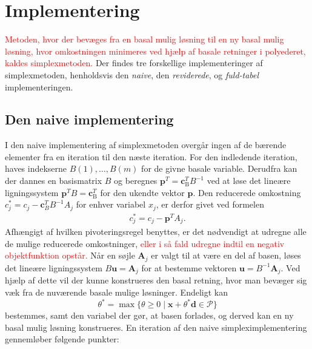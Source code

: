 %
\section{Implementering}
\label{julieergudesmuk}
\textcolor{red}{Metoden, hvor der bevæges fra en basal mulig løsning til en ny basal mulig løsning, hvor omkostningen minimeres ved hjælp af basale retninger i polyederet, kaldes simplexmetoden.}
Der findes tre forskellige implementeringer af simplexmetoden, henholdsvis den \textit{naive}, den \textit{reviderede}, og \textit{fuld-tabel} implementeringen.
%
\subsection{Den naive implementering}
I den naive implementering af simplexmetoden overgår ingen af de bærende elementer fra en iteration til den næste iteration. 
For den indledende iteration, haves indekserne
$B(1),\ldots,B(m)$ for de givne basale variable. 
Derudfra kan der dannes en basismatrix $B$ og beregnes $\mathbf{p}^T=\mathbf{c}_{\text{B}}^T B^{-1}$ ved at løse det lineære ligningssystem $\mathbf{p}^T B=\mathbf{c}_{\text{B}}^T$ for den ukendte vektor $\mathbf{p}$.
Den reducerede omkostning $c_j^* = c_j - \mathbf{c}_B^T B^{-1}A_j$ for enhver variabel $x_j$, er derfor givet ved formelen
%
\begin{align*}
c_j^* = c_j - \mathbf{p}^T A_j.
\end{align*}
%
Afhængigt af hvilken pivoteringsregel benyttes, er det nødvendigt at udregne alle de mulige reducerede omkostninger, \textcolor{red}{eller i så fald udregne indtil en negativ objektfunktion opstår.}
Når en søjle $\mathbf{A}_j$ er valgt til at være en del af basen, løses det lineære ligningssystem $B\mathbf{u}=\mathbf{A}_j$ for at bestemme vektoren $\mathbf{u}=B^{-1}\mathbf{A}_j$.
Ved hjælp af dette vil der kunne konstrueres den basal retning, hvor man bevæger sig væk fra de nuværende basale mulige løsninger.
Endeligt kan $$\theta^* = \max \{ \theta \geq 0 \mid \textbf{x} + \theta^*\textbf{d} \in \mathcal{P} \}$$ bestemmes, samt den variabel der gør, at basen forlades, og derved kan en ny basal mulig løsning konstrueres. 
En iteration af den naive simpleximplementering gennemløber følgende punkter: 
%
